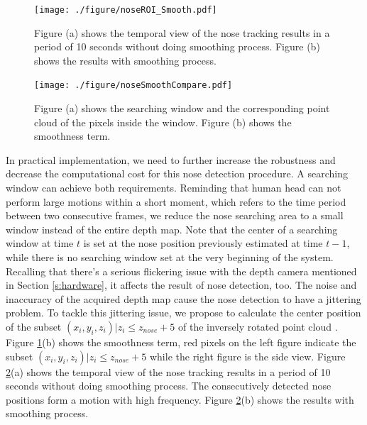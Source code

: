 \begin{figure}
\centering
\texttt{[image: ./figure/noseROI\_Smooth.pdf]}
\caption{Figure (a) shows the temporal view of the nose tracking results in a period of 10 seconds without doing smoothing process. Figure (b) shows the results with smoothing process. }
\label{f:noseROI Smooth}
\end{figure}
\begin{figure}
\centering
\texttt{[image: ./figure/noseSmoothCompare.pdf]}
\caption{Figure (a) shows the searching window and the corresponding point cloud of the pixels inside the window. Figure (b) shows the smoothness term. }
\label{f:nose Smooth Compare}
\end{figure}
In practical implementation, we need to further increase the robustness and decrease the computational cost for this nose detection procedure. A searching window can achieve both requirements. Reminding that human head can not perform large motions within a short moment, which refers to the time period between two consecutive frames, we reduce the nose searching area to a small window instead of the entire depth map. Note that the center of a searching window at time $t$ is set at the nose position previously estimated at time $t-1$, while there is no searching window set at the very beginning of the system. Recalling that there's a serious flickering issue with the depth camera mentioned in Section \ref{s:hardware}, it affects the result of nose detection, too. The noise and inaccuracy of the acquired depth map cause the nose detection to have a jittering problem. To tackle this jittering issue, we propose to calculate the center position of the subset ${(x_{i},y_{i},z_{i})|z_{i}\leq z_{nose}+5}$ of the inversely rotated point cloud . Figure \ref{f:noseROI Smooth}(b) shows the smoothness term, red pixels on the left figure indicate the subset ${(x_{i},y_{i},z_{i})|z_{i}\leq z_{nose}+5}$ while the right figure is the side view. Figure \ref{f:nose Smooth Compare}(a) shows the temporal view of the nose tracking results in a period of 10 seconds without doing smoothing process. The consecutively detected nose positions form a motion with high frequency. Figure \ref{f:nose Smooth Compare}(b) shows the results with smoothing process.

